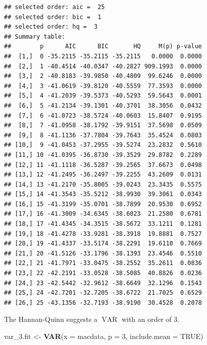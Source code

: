 \documentclass[12pt,a4paper]{article}
\newcommand{\VAR}{\operatorname{VAR}} %
\newenvironment{Shaded}{\begin{snugshade}}{\end{snugshade}}
\newcommand{\DataTypeTok}[1]{\textcolor[rgb]{0.13,0.29,0.53}{#1}}
\newcommand{\DecValTok}[1]{\textcolor[rgb]{0.00,0.00,0.81}{#1}}
\newcommand{\FloatTok}[1]{\textcolor[rgb]{0.00,0.00,0.81}{#1}}
\newcommand{\KeywordTok}[1]{\textcolor[rgb]{0.13,0.29,0.53}{\textbf{#1}}}
\newcommand{\NormalTok}[1]{#1}
\newcommand{\OtherTok}[1]{\textcolor[rgb]{0.56,0.35,0.01}{#1}}
\newcommand{\StringTok}[1]{\textcolor[rgb]{0.31,0.60,0.02}{#1}}
\begin{document}
\begin{verbatim}
## selected order: aic =  25 
## selected order: bic =  1 
## selected order: hq =  3 
## Summary table:  
##        p      AIC      BIC       HQ     M(p) p-value
##  [1,]  0 -35.2115 -35.2115 -35.2115   0.0000  0.0000
##  [2,]  1 -40.4514 -40.0347 -40.2827 909.1993  0.0000
##  [3,]  2 -40.8183 -39.9850 -40.4809  99.6246  0.0000
##  [4,]  3 -41.0619 -39.8120 -40.5559  77.3593  0.0000
##  [5,]  4 -41.2039 -39.5373 -40.5293  59.5643  0.0001
##  [6,]  5 -41.2134 -39.1301 -40.3701  38.3056  0.0432
##  [7,]  6 -41.0723 -38.5724 -40.0603  15.8407  0.9195
##  [8,]  7 -41.0958 -38.1792 -39.9151  37.5698  0.0509
##  [9,]  8 -41.1136 -37.7804 -39.7643  35.4524  0.0803
## [10,]  9 -41.0453 -37.2955 -39.5274  23.2832  0.5610
## [11,] 10 -41.0395 -36.8730 -39.3529  29.8782  0.2289
## [12,] 11 -41.1118 -36.5287 -39.2565  37.6673  0.0498
## [13,] 12 -41.2495 -36.2497 -39.2255  43.2609  0.0131
## [14,] 13 -41.2170 -35.8005 -39.0243  23.3435  0.5575
## [15,] 14 -41.3543 -35.5212 -38.9930  39.3061  0.0343
## [16,] 15 -41.3199 -35.0701 -38.7899  20.9530  0.6952
## [17,] 16 -41.3009 -34.6345 -38.6023  21.2580  0.6781
## [18,] 17 -41.4345 -34.3515 -38.5672  33.1211  0.1281
## [19,] 18 -41.4278 -33.9281 -38.3918  19.8881  0.7527
## [20,] 19 -41.4337 -33.5174 -38.2291  19.6110  0.7669
## [21,] 20 -41.5126 -33.1796 -38.1393  23.4546  0.5510
## [22,] 21 -41.7971 -33.0475 -38.2552  35.2611  0.0836
## [23,] 22 -42.2191 -33.0528 -38.5085  40.8826  0.0236
## [24,] 23 -42.5442 -32.9612 -38.6649  32.1296  0.1543
## [25,] 24 -42.7201 -32.7205 -38.6722  21.7025  0.6529
## [26,] 25 -43.1356 -32.7193 -38.9190  30.4528  0.2078
\end{verbatim}

The Hannan-Quinn suggests a \(\VAR\) with an order of 3.

\begin{Shaded}
\begin{Highlighting}[]
\NormalTok{var_}\FloatTok{3.}\NormalTok{fit <-}\StringTok{ }\KeywordTok{VAR}\NormalTok{(}\DataTypeTok{x =}\NormalTok{ macdata, }\DataTypeTok{p =} \DecValTok{3}\NormalTok{, }\DataTypeTok{include.mean =} \OtherTok{TRUE}\NormalTok{)}
\end{Highlighting}
\end{Shaded}
\end{document}
